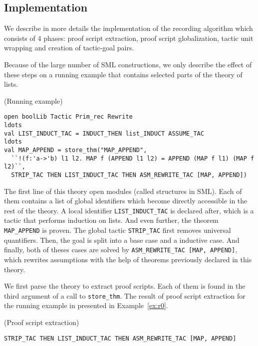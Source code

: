 \documentclass[runningheads,a4paper,draft]{svjour3}
\def\sml{\textsf{SML}\xspace}
\begin{document}
\subsection{Implementation}
We describe in more details the implementation of the recording algorithm which
consists of 4 phases: proof script extraction, proof script globalization,
tactic unit wrapping and creation of tactic-goal pairs.

Because of the large number of \sml constructions, we only describe the effect
of these steps on a running example that contains selected parts of the theory
of lists.


\begin{example}\label{ex:running}(Running example)
\small
\begin{lstlisting}[language=SMLSmall]
open boolLib Tactic Prim_rec Rewrite
ldots
val LIST_INDUCT_TAC = INDUCT_THEN list_INDUCT ASSUME_TAC
ldots
val MAP_APPEND = store_thm("MAP_APPEND",
  ``!(f:'a->'b) l1 l2. MAP f (APPEND l1 l2) = APPEND (MAP f l1) (MAP f l2)``,
  STRIP_TAC THEN LIST_INDUCT_TAC THEN ASM_REWRITE_TAC [MAP, APPEND])
\end{lstlisting}
\end{example}

The first line of this theory open modules (called structures in \sml). Each of
them contains a list of global identifiers which become directly accessible in
the rest of the theory.
A local identifier \texttt{LIST\_INDUCT\_TAC} is declared after, which is a
tactic that performs induction on lists. And even further, the theorem
\texttt{MAP\_APPEND} is proven.
The global tactic \texttt{STRIP\_TAC} first removes universal quantifiers. Then,
the goal is split into a base case and a inductive case. And finally, both of
theses cases are solved by \texttt{ASM\_REWRITE\_TAC [MAP, APPEND]}, which
rewrites assumptions with the help of theorems previously declared in this
theory.

We first parse the theory to extract proof scripts. Each of them is found in
the third argument of a call to \texttt{store\_thm}. The result of proof script
extraction for the running example in presented in Example~\ref{ex:r0}.

\begin{example}\label{ex:r0}(Proof script extraction)
\small
\begin{lstlisting}[language=SMLSmall]
STRIP_TAC THEN LIST_INDUCT_TAC THEN ASM_REWRITE_TAC [MAP, APPEND]
\end{lstlisting}
\end{example}
\end{document}
